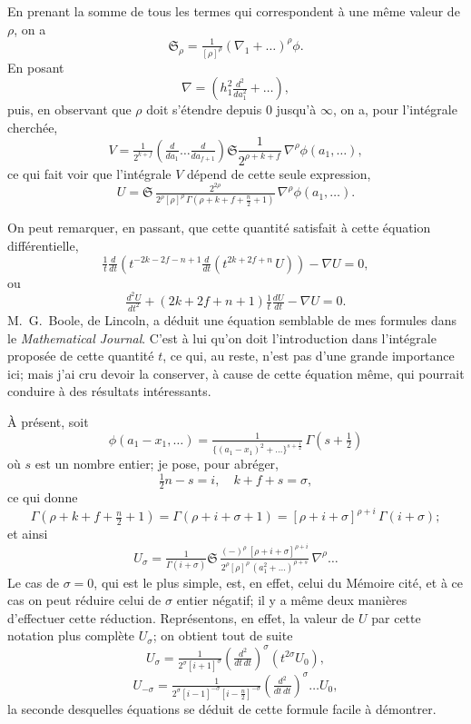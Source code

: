 \documentclass[12pt,a4paper]{article}
\providecommand{\fS}{\mathfrak{S}}
\begin{document}
En prenant la somme de tous les termes qui correspondent \`a une m\^eme valeur de $\rho$, on a
\[
\fS_{\rho} = \tfrac{1}{[\rho]^{\rho}}\left(\nabla_1 + \ldots\right)^{\rho}\phi.
\]
En posant
\[
\nabla = \left(h_1^2\tfrac{d^2}{da_1^2} + \ldots\right),
\]
puis, en observant que $\rho$ doit s'\'etendre depuis $0$ jusqu'\`a $\infty$, on a, pour l'int\'egrale cherch\'ee,
\[
V = \tfrac{1}{2^{k + f}}\left(\tfrac{d}{da_1}\ldots\tfrac{d}{da_{f+1}}\right)\fS\frac{1}{2^{\rho + k + f}}\,\nabla^{\rho}\phi(a_1, \ldots),
\]
ce qui fait voir que l'int\'egrale $V$ d\'epend de cette seule expression,
\[
U = \fS\,\tfrac{2^{2\rho}}{2^{\rho}[\rho]^{\rho}\,\Gamma(\rho + k + f + \tfrac{n}{2} + 1)}\,\nabla^{\rho}\phi(a_1, \ldots).
\]

\newpage
\setcounter{page}{198}

On peut remarquer, en passant, que cette quantit\'e satisfait \`a cette \'equation diff\'erentielle,
\[
\tfrac{1}{t}\tfrac{d}{dt}\left(t^{-2k - 2f - n + 1}\tfrac{d}{dt}(t^{2k + 2f + n}\, U)\right) - \nabla U = 0,
\]
ou
\[
\tfrac{d^2 U}{dt^2} + (2k + 2f + n + 1)\tfrac{1}{t}\tfrac{dU}{dt} - \nabla U = 0.
\]
M.~G.~Boole, de Lincoln, a d\'eduit une \'equation semblable de mes formules dans le \textit{Mathematical Journal}. C'est \`a lui qu'on doit l'introduction dans l'int\'egrale propos\'ee de cette quantit\'e $t$, ce qui, au reste, n'est pas d'une grande importance ici; mais j'ai cru devoir la conserver, \`a cause de cette \'equation m\^eme, qui pourrait conduire \`a des r\'esultats int\'eressants.

\`A pr\'esent, soit
\[
\phi(a_1 - x_1, \ldots) = \tfrac{1}{\{(a_1 - x_1)^2 + \ldots\}^{s + \tfrac12}}\,\Gamma(s + \tfrac12)
\]
o\`u $s$ est un nombre entier; je pose, pour abr\'eger,
\[
\tfrac12 n - s = i,\quad k + f + s = \sigma,
\]
ce qui donne
\[
\Gamma(\rho + k + f + \tfrac{n}{2} + 1) = \Gamma(\rho + i + \sigma + 1) = [\rho + i + \sigma]^{\rho + i}\,\Gamma(i + \sigma);
\]
et ainsi
\[
U_{\sigma} = \tfrac{1}{\Gamma(i + \sigma)}\fS\,\tfrac{(-)^{\rho}\,[\rho + i + \sigma]^{\rho + i}}{2^{\rho}[\rho]^{\rho}\,(a_1^2 + \ldots)^{\rho + s}}\,\nabla^{\rho}\ldots
\]
Le cas de $\sigma = 0$, qui est le plus simple, est, en effet, celui du M\'emoire cit\'e, et \`a ce cas on peut r\'eduire celui de $\sigma$ entier n\'egatif; il y a m\^eme deux mani\`eres d'effectuer cette r\'eduction. Repr\'esentons, en effet, la valeur de $U$ par cette notation plus compl\`ete $U_{\sigma}$; on obtient tout de suite
\[
U_{\sigma} = \tfrac{1}{2^{\sigma}[i + 1]^{\sigma}}\left(\tfrac{d^2}{dt\, dt}\right)^{\sigma}(t^{2\sigma}U_0),
\]
\[
U_{-\sigma} = \tfrac{1}{2^{\sigma}[i - 1]^{-\sigma}[i - \tfrac{n}{2}]^{-\sigma}}\left(\tfrac{d^2}{dt\, dt}\right)^{\sigma}\ldots U_0,
\]
la seconde desquelles \'equations se d\'eduit de cette formule facile \`a d\'emontrer.
\end{document}
